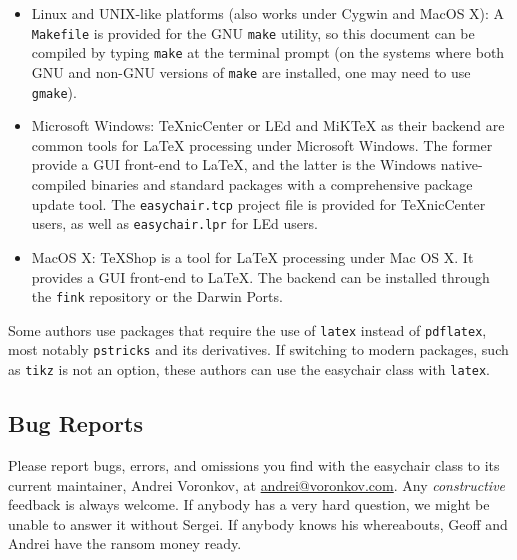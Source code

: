 \documentclass[withtimes]{easychair}
\newcommand{\easychair}{\textsf{easychair}}
\newcommand{\miktex}{MiK{\TeX}}
\newcommand{\texniccenter}{{\TeX}nicCenter}
\newcommand{\makefile}{\texttt{Makefile}}
\newcommand{\latexeditor}{LEd}
\begin{document}
\begin{itemize}
\item
Linux and UNIX-like platforms (also works under Cygwin and MacOS X):
A {\makefile} is provided for the GNU \texttt{make} \cite{gmake} utility,
so this document can be compiled by typing \texttt{make} at the terminal 
prompt (on the systems where both GNU and non-GNU versions of \texttt{make} 
are installed, one may need to use \texttt{gmake}).

\item
Microsoft Windows:
{\texniccenter} \cite{texniccenter} or {\latexeditor} \cite{led} and
{\miktex} \cite{miktex} as their backend are common tools
for {\LaTeX} processing under Microsoft Windows. 
The former provide a GUI front-end to {\LaTeX}, and the latter is the 
Windows native-compiled binaries and standard packages with 
a comprehensive package update tool. 
The \texttt{easychair.tcp} project file is provided for {\texniccenter} users,
as well as \texttt{easychair.lpr} for {\latexeditor} users.

\item
MacOS X:
TeXShop \cite{texshop} is a tool for {\LaTeX} processing under Mac OS X.
It provides a GUI front-end to {\LaTeX}. The backend can be installed
through the \texttt{fink} \cite{fink} repository or the Darwin Ports.
\end{itemize}

Some authors use packages that require the use of \texttt{latex}
instead of \texttt{pdflatex}, most notably \texttt{pstricks} and its
derivatives. If switching to modern packages, such as
\texttt{tikz} is not an option, these authors can use the {\easychair}
class with \texttt{latex}. 

\subsection{Bug Reports}
\label{sec:bug-reports}

Please report bugs, errors, and omissions you find with the {\easychair} 
class to its current maintainer, Andrei Voronkov,
at \url{andrei@voronkov.com}. Any \emph{constructive} feedback is
always welcome. If anybody has a very hard question, we might be
unable to answer it without Sergei. If anybody knows his whereabouts,
Geoff and Andrei have the ransom money ready.

\end{document}
